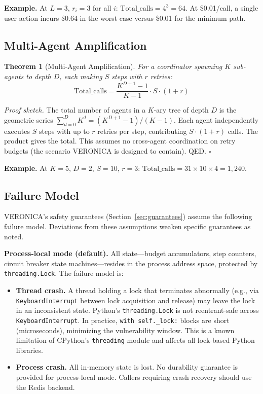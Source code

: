 \documentclass[11pt]{article}
\newtheorem{theorem}{Theorem}
\newenvironment{proofsketch}{\par\noindent\textit{Proof sketch.}\enspace}{\hfill$\square$\par\medskip}
\begin{document}
\textbf{Example.} At $L{=}3$, $r_i{=}3$ for all $i$:
$\text{Total\_calls} = 4^3 = 64$. At \$0.01/call, a single user action
incurs \$0.64 in the worst case versus \$0.01 for the minimum path.

\subsection{Multi-Agent Amplification}

\begin{theorem}[Multi-Agent Amplification]
For a coordinator spawning $K$ sub-agents to depth $D$, each making $S$ steps
with $r$ retries:
\[
  \text{Total\_calls} = \frac{K^{D+1} - 1}{K - 1} \cdot S \cdot (1 + r)
\]
\end{theorem}

\begin{proofsketch}
The total number of agents in a $K$-ary tree of depth $D$ is the geometric
series $\sum_{d=0}^{D} K^d = (K^{D+1} - 1) / (K - 1)$. Each agent
independently executes $S$ steps with up to $r$ retries per step, contributing
$S \cdot (1 + r)$ calls. The product gives the total. This assumes no
cross-agent coordination on retry budgets (the scenario VERONICA is designed
to contain). QED.
\end{proofsketch}

\textbf{Example.} At $K{=}5$, $D{=}2$, $S{=}10$, $r{=}3$:
$\text{Total\_calls} = 31 \times 10 \times 4 = 1{,}240$.

\subsection{Failure Model}

VERONICA's safety guarantees (Section~\ref{sec:guarantees}) assume the
following failure model. Deviations from these assumptions weaken specific
guarantees as noted.

\textbf{Process-local mode (default).} All state---budget accumulators, step
counters, circuit breaker state machines---resides in the process address
space, protected by \texttt{threading.Lock}. The failure model is:

\begin{itemize}[nosep]
  \item \textbf{Thread crash.} A thread holding a lock that terminates
    abnormally (e.g., via \texttt{KeyboardInterrupt} between lock acquisition
    and release) may leave the lock in an inconsistent state. Python's
    \texttt{threading.Lock} is not reentrant-safe across
    \texttt{KeyboardInterrupt}. In practice, \texttt{with self.\_lock:} blocks
    are short (microseconds), minimizing the vulnerability window. This is a
    known limitation of CPython's \texttt{threading} module and affects all
    lock-based Python libraries.
  \item \textbf{Process crash.} All in-memory state is lost. No durability
    guarantee is provided for process-local mode. Callers requiring crash
    recovery should use the Redis backend.
\end{itemize}
\end{document}
